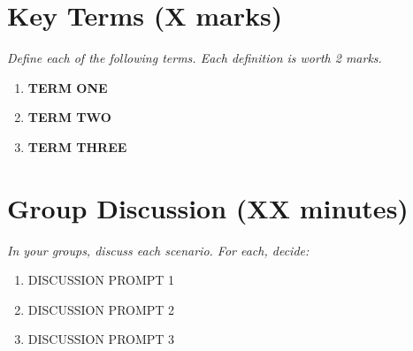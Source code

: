 \vspace{1em}

\section*{Key Terms (X marks)}

\textit{Define each of the following terms. Each definition is worth 2 marks.}

\vspace{0.5em}

\begin{enumerate}[leftmargin=*, label=\textbf{\arabic*.}]

    \item \textbf{TERM ONE} \\[3cm]

    \item \textbf{TERM TWO} \\[3cm]

    \item \textbf{TERM THREE} \\[3cm]

\end{enumerate}

\newpage

\section*{Group Discussion (XX minutes)}

\textit{In your groups, discuss each scenario. For each, decide:}
\begin{enumerate}[label=(\alph*), topsep=2pt]
    \item DISCUSSION PROMPT 1
    \item DISCUSSION PROMPT 2
    \item DISCUSSION PROMPT 3
\end{enumerate}

